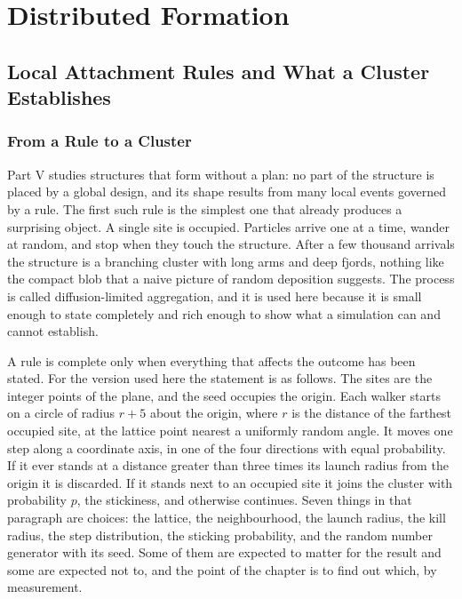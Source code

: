 \part{Distributed Formation}

\chapter{Local Attachment Rules and What a Cluster Establishes}

\section{From a Rule to a Cluster}

Part V studies structures that form without a plan: no part of the structure is placed by a global design, and its shape results from many local events governed by a rule. The first such rule is the simplest one that already produces a surprising object. A single site is occupied. Particles arrive one at a time, wander at random, and stop when they touch the structure. After a few thousand arrivals the structure is a branching cluster with long arms and deep fjords, nothing like the compact blob that a naive picture of random deposition suggests. The process is called diffusion-limited aggregation, and it is used here because it is small enough to state completely and rich enough to show what a simulation can and cannot establish.

A rule is complete only when everything that affects the outcome has been stated. For the version used here the statement is as follows. The sites are the integer points of the plane, and the seed occupies the origin. Each walker starts on a circle of radius $r+5$ about the origin, where $r$ is the distance of the farthest occupied site, at the lattice point nearest a uniformly random angle. It moves one step along a coordinate axis, in one of the four directions with equal probability. If it ever stands at a distance greater than three times its launch radius from the origin it is discarded. If it stands next to an occupied site it joins the cluster with probability $p$, the stickiness, and otherwise continues. Seven things in that paragraph are choices: the lattice, the neighbourhood, the launch radius, the kill radius, the step distribution, the sticking probability, and the random number generator with its seed. Some of them are expected to matter for the result and some are expected not to, and the point of the chapter is to find out which, by measurement.


